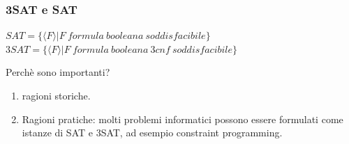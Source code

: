 \documentclass[a4paper, 12pt]{article}
\begin{document}
\subsubsection{3SAT e SAT}
\begin{center}
$SAT = \{\langle F \rangle | F\ formula\ booleana\ soddisfacibile\}$\\
$3SAT = \{\langle F \rangle | F\ formula\ booleana\ 3cnf\ soddisfacibile\}$
\end{center}
Perch\`e sono importanti?\\
\begin{enumerate}
\item ragioni storiche.
\item Ragioni pratiche: molti problemi informatici possono essere formulati come istanze di SAT e 3SAT, ad esempio constraint programming.
\end{enumerate}
\end{document}
